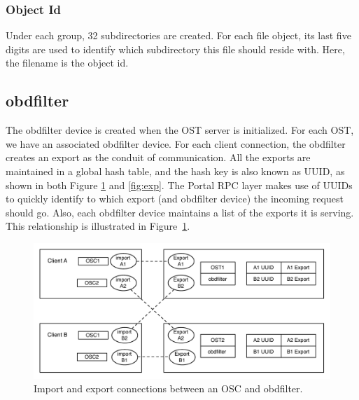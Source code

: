 \subsubsection*{Object Id}

Under each group, 32 subdirectories are created. For each file object, its
last five digits are used to identify which subdirectory this file should reside
with. Here, the filename is the object id.

\subsection{obdfilter}

The obdfilter device is created when the OST server is initialized. For each
OST, we have an associated obdfilter device. For each client connection, the
obdfilter creates an export as the conduit of communication. All the exports
are maintained in a global hash table, and the hash key is also known as UUID,
as shown in both Figure \ref{fig:obdfilter_conns} and \ref{fig:exp}. The
Portal RPC layer makes use of UUIDs to quickly identify to which export (and
obdfilter device) the incoming request should go. Also, each obdfilter device
maintains a list of the exports it is serving. This relationship is
illustrated in Figure~\ref{fig:obdfilter_conns}. 

\begin{figure}[htb]
\centering
\includegraphics[width=4.5in]{img/obdfilter_conns}
\caption{Import and export connections between an OSC and obdfilter.}
\label{fig:obdfilter_conns}
\end{figure}

